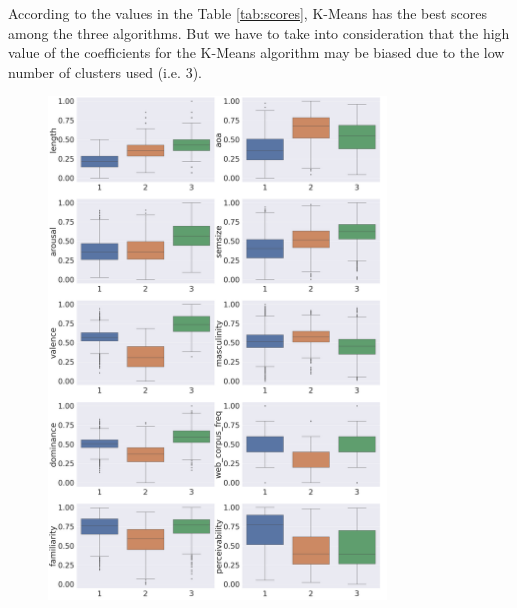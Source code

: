 \documentclass[a4paper,11pt,dvipsnames]{article}
\begin{document}
According to the values in the Table \ref{tab:scores}, K-Means has the best scores among the three algorithms. But we have to take into consideration that the high value of the coefficients for the K-Means algorithm may be biased due to the low number of clusters used (i.e. 3).
\begin{figure}[h]
    \begin{minipage}{0.47\linewidth}
            \centering
            \includegraphics[width=0.8\textwidth]{kmeans-box2.png}
            \label{fig:boxclukmeans}
    \end{minipage}
    \hfil
    \begin{minipage}{0.47\linewidth}
            \centering

\end{minipage}
\end{figure}
\end{document}
